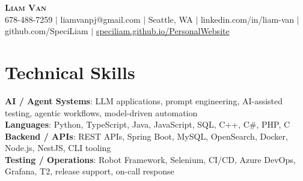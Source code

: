 \documentclass[letterpaper,11pt]{article}
\begin{document}

%
\begin{center}
    \textbf{\Huge \scshape Liam Van} \\ \vspace{1pt}
    \small 678-488-7259 $|$ \small {liamvanpj@gmail.com} $|$ Seattle, WA
 {{$|$ linkedin.com/in/liam-van} {$|$ github.com/SpeciLiam} {$|$ \href{https://speciliam.github.io/PersonalWebsite}{speciliam.github.io/PersonalWebsite}}}

\end{center}

\section{Technical Skills}
 \begin{itemize}[leftmargin=0.15in, label={}]
    \small{\item{
     \textbf{AI / Agent Systems}{: LLM applications, prompt engineering, AI-assisted testing, agentic workflows, model-driven automation} \\
     \textbf{Languages}{: Python, TypeScript, Java, JavaScript, SQL, C++, C\#, PHP, C} \\
     \textbf{Backend / APIs}{: REST APIs, Spring Boot, MySQL, OpenSearch, Docker, Node.js, NestJS, CLI tooling} \\
     \textbf{Testing / Operations}{: Robot Framework, Selenium, CI/CD, Azure DevOps, Grafana, T2, release support, on-call response} \\
    }}
 \end{itemize}
%
\end{document}
